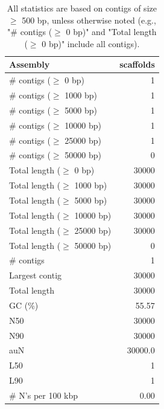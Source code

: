 \documentclass[12pt,a4paper]{article}
\begin{document}
\begin{table}[ht]
\begin{center}
\caption{All statistics are based on contigs of size $\geq$ 500 bp, unless otherwise noted (e.g., "\# contigs ($\geq$ 0 bp)" and "Total length ($\geq$ 0 bp)" include all contigs).}
\begin{tabular}{|l*{1}{|r}|}
\hline
Assembly & scaffolds \\ \hline
\# contigs ($\geq$ 0 bp) & 1 \\ \hline
\# contigs ($\geq$ 1000 bp) & 1 \\ \hline
\# contigs ($\geq$ 5000 bp) & 1 \\ \hline
\# contigs ($\geq$ 10000 bp) & 1 \\ \hline
\# contigs ($\geq$ 25000 bp) & 1 \\ \hline
\# contigs ($\geq$ 50000 bp) & 0 \\ \hline
Total length ($\geq$ 0 bp) & 30000 \\ \hline
Total length ($\geq$ 1000 bp) & 30000 \\ \hline
Total length ($\geq$ 5000 bp) & 30000 \\ \hline
Total length ($\geq$ 10000 bp) & 30000 \\ \hline
Total length ($\geq$ 25000 bp) & 30000 \\ \hline
Total length ($\geq$ 50000 bp) & 0 \\ \hline
\# contigs & 1 \\ \hline
Largest contig & 30000 \\ \hline
Total length & 30000 \\ \hline
GC (\%) & 55.57 \\ \hline
N50 & 30000 \\ \hline
N90 & 30000 \\ \hline
auN & 30000.0 \\ \hline
L50 & 1 \\ \hline
L90 & 1 \\ \hline
\# N's per 100 kbp & 0.00 \\ \hline
\end{tabular}
\end{center}
\end{table}
\end{document}
